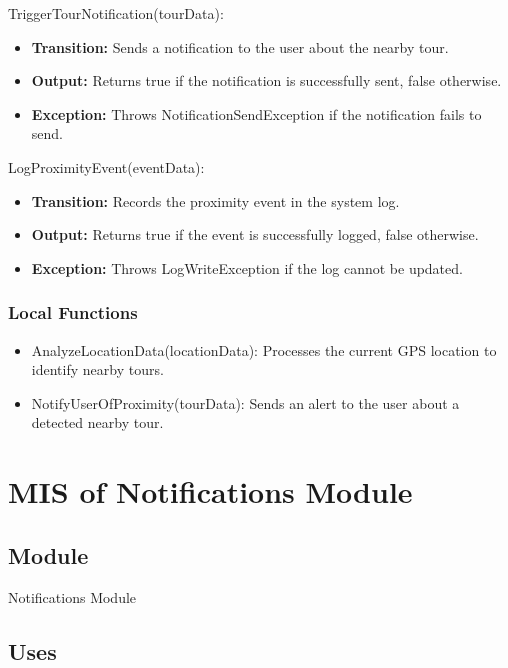 \documentclass[12pt, titlepage]{article}
\begin{document}
\noindent TriggerTourNotification(tourData):
\begin{itemize}
    \item \textbf{Transition:} Sends a notification to the user about the nearby tour.
    \item \textbf{Output:} Returns true if the notification is successfully sent, false otherwise.
    \item \textbf{Exception:} Throws NotificationSendException if the notification fails to send.
\end{itemize}

\noindent LogProximityEvent(eventData):
\begin{itemize}
    \item \textbf{Transition:} Records the proximity event in the system log.
    \item \textbf{Output:} Returns true if the event is successfully logged, false otherwise.
    \item \textbf{Exception:} Throws LogWriteException if the log cannot be updated.
\end{itemize}

\subsubsection{Local Functions}

\begin{itemize}
    \item AnalyzeLocationData(locationData): Processes the current GPS location to identify nearby tours.
    \item NotifyUserOfProximity(tourData): Sends an alert to the user about a detected nearby tour.
\end{itemize}

\newpage


\section{MIS of Notifications Module} \label{Module_Notifications}

\subsection{Module}

Notifications Module

\subsection{Uses}
\end{document}
